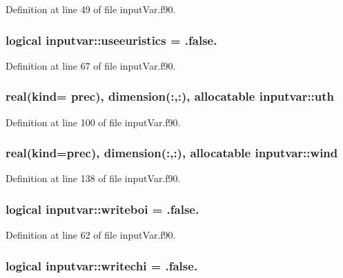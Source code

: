 Definition at line 49 of file input\-Var.\-f90.

\hypertarget{classinputvar_a04f11d38b133803024202cc546abddc3}{
\subsubsection[{useeuristics}]{\setlength{\rightskip}{0pt plus 5cm}logical inputvar\-::useeuristics = .false.}}\label{classinputvar_a04f11d38b133803024202cc546abddc3}


Definition at line 67 of file input\-Var.\-f90.

\hypertarget{classinputvar_abd9a09032c8d997c45cd49020fb78609}{
\subsubsection[{uth}]{\setlength{\rightskip}{0pt plus 5cm}real(kind= prec), dimension(\-:,\-:), allocatable inputvar\-::uth}}\label{classinputvar_abd9a09032c8d997c45cd49020fb78609}


Definition at line 100 of file input\-Var.\-f90.

\hypertarget{classinputvar_a984abc6260080087c3c555784481627d}{
\subsubsection[{wind}]{\setlength{\rightskip}{0pt plus 5cm}real(kind=prec), dimension(\-:,\-:), allocatable inputvar\-::wind}}\label{classinputvar_a984abc6260080087c3c555784481627d}


Definition at line 138 of file input\-Var.\-f90.

\hypertarget{classinputvar_adfc2c014d1631c831bd700d9ff13dcff}{
\subsubsection[{writeboi}]{\setlength{\rightskip}{0pt plus 5cm}logical inputvar\-::writeboi = .false.}}\label{classinputvar_adfc2c014d1631c831bd700d9ff13dcff}


Definition at line 62 of file input\-Var.\-f90.

\hypertarget{classinputvar_a6e34f329672526cc9e682125013ce5e7}{
\subsubsection[{writechi}]{\setlength{\rightskip}{0pt plus 5cm}logical inputvar\-::writechi = .false.}}\label{classinputvar_a6e34f329672526cc9e682125013ce5e7}


